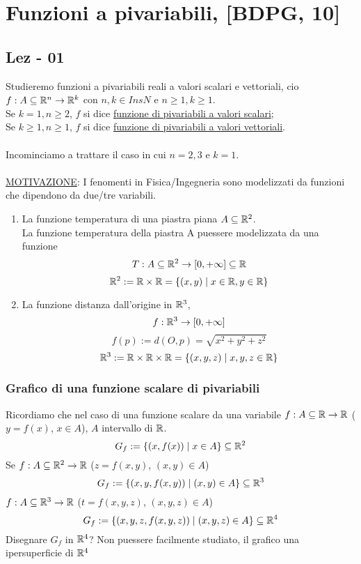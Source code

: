 \chapter{Funzioni a pi\acu variabili, [BDPG, 10]}
\section{Lez - 01}
Studieremo funzioni a pi\acu variabili reali a valori scalari e vettoriali, cio\ace 
$f : A \subseteq \mathbb{R}^n \to \mathbb{R}^k$ con $n, k \in Ins{N}$ e $n \geq 1, k \geq 1$. \\
Se $k = 1, n \geq 2$, $f$ si dice \underline{funzione di pi\acu variabili a valori scalari}; \\
Se $k \geq 1, n \geq 1$, $f$ si dice \underline{funzione di pi\acu variabili a valori vettoriali}.\\\\
Incominciamo a trattare il caso in cui $n = 2,3$ e $k = 1$.\\\\
\underline{MOTIVAZIONE}: I fenomenti in Fisica/Ingegneria sono modelizzati da funzioni che dipendono da due/tre variabili. 
\begin{example}
  \begin{enumerate}
    \item La funzione temperatura di una piastra piana $A \subseteq \mathbb{R}^2$. \\
          La funzione temperatura della piastra A pu\aco essere modelizzata da una funzione 
          $$T : A \subseteq \mathbb{R}^2 \to [0, +\infty] \subseteq \mathbb{R}$$
          $$\mathbb{R}^2 := \mathbb{R} \times \mathbb{R} = \{(x,y)\mid x \in \mathbb{R}, y \in \mathbb{R}\}$$
    \item La funzione distanza dall'origine in $\mathbb{R}^3$, $$f: \mathbb{R}^3 \to [0,+\infty]$$
          $$f(p) := d(O, p) = \sqrt{x^2+y^2+z^2}$$
          $$\mathbb{R}^3 := \mathbb{R} \times \mathbb{R} \times \mathbb{R}= \{(x,y,z)\mid x, y, z \in \mathbb{R}\}$$
  \end{enumerate}
\end{example} 
\subsection{Grafico di una funzione scalare di pi\acu variabili}
Ricordiamo che nel caso di una funzione scalare da una variabile $f: A \subseteq \mathbb{R} \to \mathbb{R}$ ($y = f(x)$, $x \in A$), 
$A$ intervallo di $\mathbb{R}$.
$$G_f := \{(x,f(x))\mid x \in A\} \subseteq \mathbb{R}^2$$
Se $f: A \subseteq \mathbb{R}^2 \to \mathbb{R}$ ($z = f(x,y)$, $(x,y) \in A$)
$$G_f := \{(x,y,f(x,y))\mid (x,y) \in A\} \subseteq \mathbb{R}^3$$
$f: A \subseteq \mathbb{R}^3 \to \mathbb{R}$ ($t = f(x,y,z)$, $(x,y,z) \in A$)
$$G_f := \{(x,y,z,f(x,y,z))\mid (x,y,z) \in A\} \subseteq \mathbb{R}^4$$
Disegnare $G_f$ in $\mathbb{R}^4$? Non pu\aco essere facilmente studiato, il grafico \ace una ipersuperficie di $\mathbb{R}^4$
